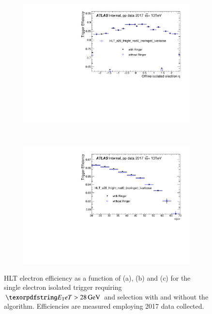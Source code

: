 \begin{figure}[h!tb]
\begin{center}
\begin{subfigure}[c]{.58\textwidth}
  \end{subfigure} \\
  \begin{subfigure}[c]{.58\textwidth}
  \centering
  \includegraphics[width=\textwidth]{sections/04_operation/figures/efficiencies/eff_EGAM1_e28_ringer_and_noringer_2017_after_ts1_HLT_eta.pdf}
  \caption{}%
  \end{subfigure} \\
  \begin{subfigure}[c]{.58\textwidth}
  \centering
  \includegraphics[width=\textwidth]{sections/04_operation/figures/efficiencies/eff_EGAM1_e28_ringer_and_noringer_2017_after_ts1_HLT_mu.pdf}
  \caption{}%
  \label{fig:e28_comp_mu}
  \end{subfigure}
  \caption{\label{fig:e28_triggers}HLT electron efficiency as a function of \et{}
    (a), \eta{} (b) and \avgmu{} (c) for the single electron isolated trigger
    requiring $\et{} > \SI{28}{\GeV}$ and \tight{} selection with and without the
    \rnn{} algorithm. Efficiencies are measured employing 2017 data collected.}
  \end{center}
\end{figure}
  
